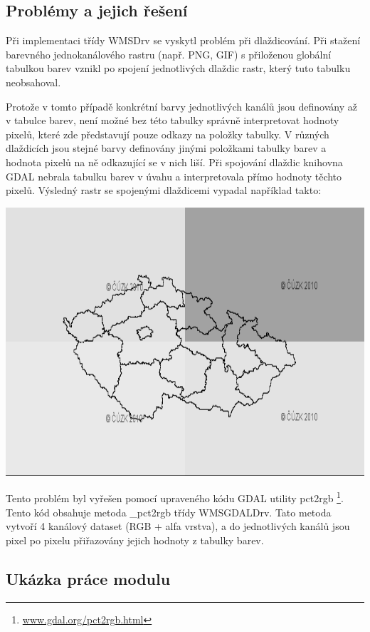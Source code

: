 \documentclass[a4paper,12pt]{article}
\begin{document}
\subsection{Problémy a jejich řešení}

Při implementaci třídy WMSDrv se vyskytl problém při dlaždicování.
Při stažení barevného jednokanálového rastru (např. PNG, GIF) s přiloženou globální tabulkou barev vznikl po spojení jednotlivých dlaždic rastr, který tuto tabulku neobsahoval.

Protože v tomto případě konkrétní barvy jednotlivých kanálů jsou definovány až v tabulce barev, není možné bez této tabulky správně interpretovat hodnoty pixelů, které  zde představují pouze odkazy na položky tabulky. V různých dlaždicích jsou stejné barvy definovány jinými položkami tabulky barev a hodnota pixelů na ně odkazující se v nich liší. 
Při spojování dlaždic knihovna GDAL nebrala tabulku barev v úvahu a interpretovala přímo hodnoty těchto pixelů. Výsledný rastr se spojenými dlaždicemi vypadal například takto: 

 \includegraphics[scale=0.4]{figures/color_table_problem.png}



Tento problém byl vyřešen pomocí upraveného kódu GDAL utility pct2rgb \footnote{\url{www.gdal.org/pct2rgb.html}}. Tento kód obsahuje metoda \_pct2rgb třídy  WMSGDALDrv.
Tato metoda vytvoří 4 kanálový dataset (RGB + alfa vrstva), a do jednotlivých kanálů jsou pixel po pixelu přiřazovány jejich hodnoty z tabulky barev. 

\subsection{Ukázka práce modulu}
\end{document}
